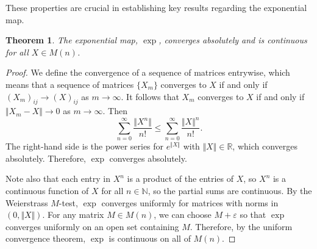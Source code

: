 \documentclass[12pt]{article}
\newcommand{\R}{\mathbb{R}}
\newcommand{\N}{\mathbb{N}}
\newcommand{\V}{\Vert}
\newtheorem{them}{Theorem}[section]
\theoremstyle{definition}
\theoremstyle{definition}
\theoremstyle{definition}
\theoremstyle{definition}
\theoremstyle{definition}
\theoremstyle{definition}
\theoremstyle{definition}
\theoremstyle{definition}
\begin{document}
\par{These properties are crucial in establishing key results regarding the exponential map.}

\begin{them}\label{them:cac}
The exponential map, $\exp$, converges absolutely
and is continuous for all $X \in M(n)$.
\end{them}

\begin{proof}
\par{
We define the convergence of a sequence of
matrices entrywise, which means that a sequence of
matrices $\{X_m\}$ converges to $X$ if and only if
${(X_m)}_{ij} \to (X)_{ij}$ as $m \to \infty$. It
follows that $X_m$ converges to $X$ if and only if
$\V X_m - X \V \to 0$ as $m \to \infty$. Then 
\[
    \sum_{n=0}^{\infty}\frac{\V X^n\V}{n!} \leq \sum_{n=0}^\infty \frac{\V X \V^n}{n!}.
\] 
The right-hand side is the power series for $e^{\V X \V}$ with $\V X \V \in \R$, which converges absolutely. Therefore, $\exp$ converges absolutely.}

\par{Note also that each entry in $X^n$ is a product of
the entries of $X$, so $X^n$ is a continuous
function of $X$ for all $n \in \N$, so the
partial sums are continuous. By the Weierstrass
$M$-test, $\exp$ converges uniformly for
matrices with norms in $(0, \V X \V)$. For any
matrix $M \in M(n)$, we can choose $M +
\varepsilon$ so that $\exp$ converges uniformly on
an open set containing $M$. Therefore, by the
uniform convergence theorem, $\exp$ is
continuous on all of $M(n)$.}
\end{proof}
\end{document}
